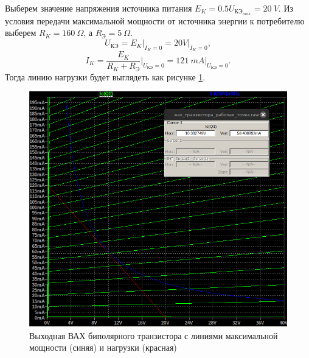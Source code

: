 Выберем значение напряжения источника питания $E_K=0.5U_\text{КЭ$_{max}$}=20\ V$.
Из условия передачи максимальной мощности от источника
энергии к потребителю выберем $R_K=160\ \Omega$, а 
$R_\text{Э}=5\ \Omega$. 
\begin{equation*}
    U_\text{КЭ}=E_K\Big|_{I_K=0}=20V\Big|_{I_K=0},
\end{equation*}
\begin{equation*}
    I_K=\frac{E_K}{R_K+R_\text{Э}}\Big|_{U_\text{КЭ}=0}=121\ mA\Big|_{U_\text{КЭ}=0}.
\end{equation*}
Тогда линию нагрузки будет выглядеть как рисунке \ref{fig:линии}.
\begin{figure}[H]
    \centering
    \includegraphics[width=1\textwidth]{figs/линии.png}
    \caption{Выходная ВАХ биполярного транзистора с линиями максимальной мощности (синяя) и нагрузки (красная)}
    \label{fig:линии}
\end{figure}

